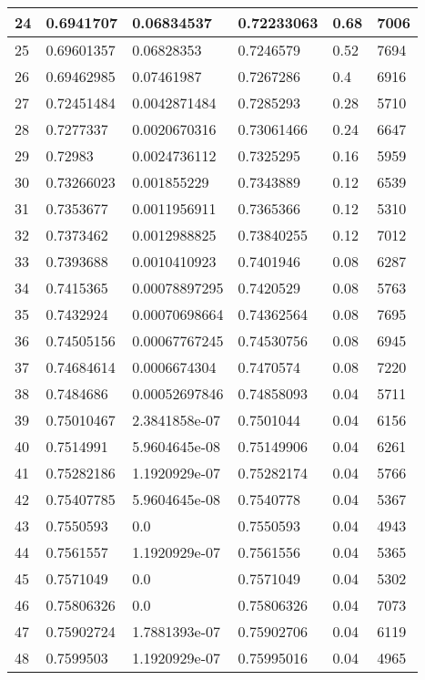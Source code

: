 \begin{longtable}{|l|l|l|l|l|l|}
24 & 0.6941707 & 0.06834537 & 0.72233063 & 0.68 & 7006 \\ \hline 
25 & 0.69601357 & 0.06828353 & 0.7246579 & 0.52 & 7694 \\ \hline 
26 & 0.69462985 & 0.07461987 & 0.7267286 & 0.4 & 6916 \\ \hline 
27 & 0.72451484 & 0.0042871484 & 0.7285293 & 0.28 & 5710 \\ \hline 
28 & 0.7277337 & 0.0020670316 & 0.73061466 & 0.24 & 6647 \\ \hline 
29 & 0.72983 & 0.0024736112 & 0.7325295 & 0.16 & 5959 \\ \hline 
30 & 0.73266023 & 0.001855229 & 0.7343889 & 0.12 & 6539 \\ \hline 
31 & 0.7353677 & 0.0011956911 & 0.7365366 & 0.12 & 5310 \\ \hline 
32 & 0.7373462 & 0.0012988825 & 0.73840255 & 0.12 & 7012 \\ \hline 
33 & 0.7393688 & 0.0010410923 & 0.7401946 & 0.08 & 6287 \\ \hline 
34 & 0.7415365 & 0.00078897295 & 0.7420529 & 0.08 & 5763 \\ \hline 
35 & 0.7432924 & 0.00070698664 & 0.74362564 & 0.08 & 7695 \\ \hline 
36 & 0.74505156 & 0.00067767245 & 0.74530756 & 0.08 & 6945 \\ \hline 
37 & 0.74684614 & 0.0006674304 & 0.7470574 & 0.08 & 7220 \\ \hline 
38 & 0.7484686 & 0.00052697846 & 0.74858093 & 0.04 & 5711 \\ \hline 
39 & 0.75010467 & 2.3841858e-07 & 0.7501044 & 0.04 & 6156 \\ \hline 
40 & 0.7514991 & 5.9604645e-08 & 0.75149906 & 0.04 & 6261 \\ \hline 
41 & 0.75282186 & 1.1920929e-07 & 0.75282174 & 0.04 & 5766 \\ \hline 
42 & 0.75407785 & 5.9604645e-08 & 0.7540778 & 0.04 & 5367 \\ \hline 
43 & 0.7550593 & 0.0 & 0.7550593 & 0.04 & 4943 \\ \hline 
44 & 0.7561557 & 1.1920929e-07 & 0.7561556 & 0.04 & 5365 \\ \hline 
45 & 0.7571049 & 0.0 & 0.7571049 & 0.04 & 5302 \\ \hline 
46 & 0.75806326 & 0.0 & 0.75806326 & 0.04 & 7073 \\ \hline 
47 & 0.75902724 & 1.7881393e-07 & 0.75902706 & 0.04 & 6119 \\ \hline 
48 & 0.7599503 & 1.1920929e-07 & 0.75995016 & 0.04 & 4965 \\ \hline 

\end{longtable}
